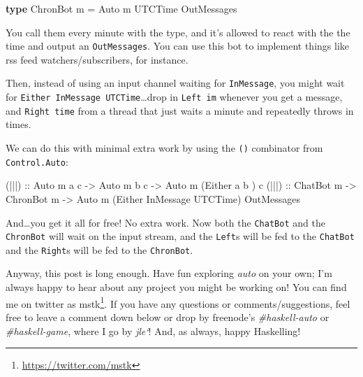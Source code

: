 \documentclass[]{article}
\newenvironment{Shaded}{}{}
\newcommand{\KeywordTok}[1]{\textcolor[rgb]{0.00,0.44,0.13}{\textbf{{#1}}}}
\newcommand{\DataTypeTok}[1]{\textcolor[rgb]{0.56,0.13,0.00}{{#1}}}
\newcommand{\OtherTok}[1]{\textcolor[rgb]{0.00,0.44,0.13}{{#1}}}
\newcommand{\FunctionTok}[1]{\textcolor[rgb]{0.02,0.16,0.49}{{#1}}}
\newcommand{\NormalTok}[1]{{#1}}
\renewcommand{\href}[2]{#2\footnote{\url{#1}}}
\begin{document}
\begin{Shaded}
\begin{Highlighting}[]
\KeywordTok{type} \DataTypeTok{ChronBot} \NormalTok{m }\FunctionTok{=} \DataTypeTok{Auto} \NormalTok{m }\DataTypeTok{UTCTime} \DataTypeTok{OutMessages}
\end{Highlighting}
\end{Shaded}

You call them every minute with the type, and it's allowed to react with the the time and output an
\texttt{OutMessages}. You can use this bot to implement things like rss feed watchers/subscribers,
for instance.

Then, instead of using an input channel waiting for \texttt{InMessage}, you might wait for
\texttt{Either\ InMessage\ UTCTime}\ldots{}drop in \texttt{Left\ im} whenever you get a message, and
\texttt{Right\ time} from a thread that just waits a minute and repeatedly throws in times.

We can do this with minimal extra work by using the \texttt{(\textbar{}\textbar{}\textbar{})}
combinator from \texttt{Control.Auto}:

\begin{Shaded}
\begin{Highlighting}[]
\OtherTok{(|||) ::} \DataTypeTok{Auto} \NormalTok{m a c }\OtherTok{->} \DataTypeTok{Auto} \NormalTok{m b c }\OtherTok{->} \DataTypeTok{Auto} \NormalTok{m (}\DataTypeTok{Either} \NormalTok{a         b      ) c}
\OtherTok{(|||) ::} \DataTypeTok{ChatBot} \NormalTok{m  }\OtherTok{->} \DataTypeTok{ChronBot} \NormalTok{m }\OtherTok{->} \DataTypeTok{Auto} \NormalTok{m (}\DataTypeTok{Either} \DataTypeTok{InMessage} \DataTypeTok{UTCTime}\NormalTok{) }\DataTypeTok{OutMessages}
\end{Highlighting}
\end{Shaded}

And\ldots{}you get it all for free! No extra work. Now both the \texttt{ChatBot} and the
\texttt{ChronBot} will wait on the input stream, and the \texttt{Left}s will be fed to the
\texttt{ChatBot} and the \texttt{Right}s will be fed to the \texttt{ChronBot}.

Anyway, this post is long enough. Have fun exploring \emph{auto} on your own; I'm always happy to
hear about any project you might be working on! You can find me on twitter as
\href{https://twitter.com/mstk}{mstk}. If you have any questions or comments/suggestions, feel free
to leave a comment down below or drop by freenode's \emph{\#haskell-auto} or \emph{\#haskell-game},
where I go by \emph{jle`}! And, as always, happy Haskelling!
\end{document}
